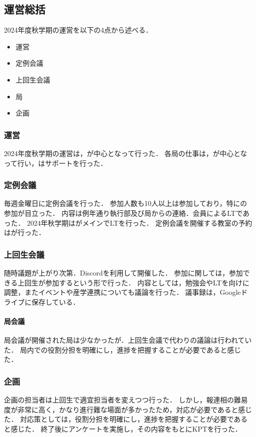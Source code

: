 \subsection*{運営総括}


2024年度秋学期の運営を以下の4点から述べる．
\begin{itemize}
    \item 運営
    \item 定例会議
    \item 上回生会議
    \item 局
    \item 企画
\end{itemize}

\subsubsection*{運営}
2024年度秋学期の運営は，\thirdGrade{}が中心となって行った．
各局の仕事は\firstGrade{}，\secondGrade{}が中心となって行い，\thirdGrade{}はサポートを行った．

\subsubsection*{定例会議}
毎週金曜日に定例会議を行った．
参加人数も10人以上は参加しており，特に\firstGrade{}の参加が目立った．
内容は例年通り執行部及び局からの連絡．会員によるLTであった．
2024年秋学期は\firstGrade{}がメインでLTを行った．
定例会議を開催する教室の予約は\kensuiChief{}が行った．

\subsubsection*{上回生会議}
随時議題が上がり次第．Discordを利用して開催した．
参加に関しては，参加できる上回生が参加するという形で行った．
内容としては，勉強会やLTを\firstGrade{}向けに調整，またイベントや産学連携についても議論を行った．
議事録は，Googleドライブに保存している．

\paragraph*{局会議}
局会議が開催された局は少なかったが．上回生会議で代わりの議論は行われていた．
局内での役割分担を明確にし，進捗を把握することが必要であると感じた．

\subsubsection*{企画}
企画の担当者は上回生で適宜担当者を変えつつ行った．
しかし，報連相の難易度が非常に高く，かなり進行難な場面が多かったため，対応が必要であると感じた．
対応策としては，役割分担を明確にし，進捗を把握することが必要であると感じた．
終了後にアンケートを実施し，その内容をもとにKPTを行った．